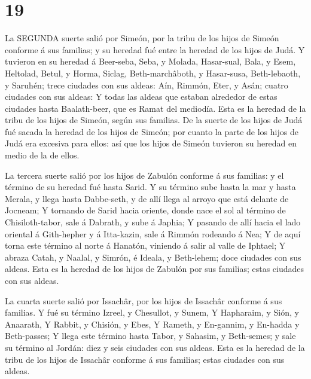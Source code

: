 \hypertarget{section-18}{%
\section{19}\label{section-18}}

 La SEGUNDA suerte salió por Simeón, por la tribu de los
hijos de Simeón conforme á sus familias; y su heredad fué entre la
heredad de los hijos de Judá.  Y tuvieron en su heredad á
Beer-seba, Seba, y Molada,  Hasar-sual, Bala, y Esem,
 Heltolad, Betul, y Horma,  Siclag,
Beth-marchâboth, y Hasar-susa,  Beth-lebaoth, y Saruhén;
trece ciudades con sus aldeas:  Aín, Rimmón, Eter, y Asán;
cuatro ciudades con sus aldeas:  Y todas las aldeas que
estaban alrededor de estas ciudades hasta Baalath-beer, que es Ramat del
mediodía. Esta es la heredad de la tribu de los hijos de Simeón, según
sus familias.  De la suerte de los hijos de Judá fué sacada
la heredad de los hijos de Simeón; por cuanto la parte de los hijos de
Judá era excesiva para ellos: así que los hijos de Simeón tuvieron su
heredad en medio de la de ellos.

 La tercera suerte salió por los hijos de Zabulón conforme
á sus familias: y el término de su heredad fué hasta Sarid.
 Y su término sube hasta la mar y hasta Merala, y llega
hasta Dabbe-seth, y de allí llega al arroyo que está delante de Jocneam;
 Y tornando de Sarid hacia oriente, donde nace el sol al
término de Chisiloth-tabor, sale á Dabrath, y sube á Japhia;
 Y pasando de allí hacia el lado oriental á Gith-hepher y á
Itta-kazin, sale á Rimmón rodeando á Nea;  Y de aquí torna
este término al norte á Hanatón, viniendo á salir al valle de Iphtael;
 Y abraza Catah, y Naalal, y Simrón, é Ideala, y
Beth-lehem; doce ciudades con sus aldeas.  Esta es la
heredad de los hijos de Zabulón por sus familias; estas ciudades con sus
aldeas.

 La cuarta suerte salió por Issachâr, por los hijos de
Issachâr conforme á sus familias.  Y fué su término Izreel,
y Chesullot, y Sunem,  Y Hapharaim, y Sión, y Anaarath,
 Y Rabbit, y Chisión, y Ebes,  Y Rameth, y
En-gannim, y En-hadda y Beth-passes;  Y llega este término
hasta Tabor, y Sahasim, y Beth-semes; y sale su término al Jordán: diez
y seis ciudades con sus aldeas.  Esta es la heredad de la
tribu de los hijos de Issachâr conforme á sus familias; estas ciudades
con sus aldeas.

